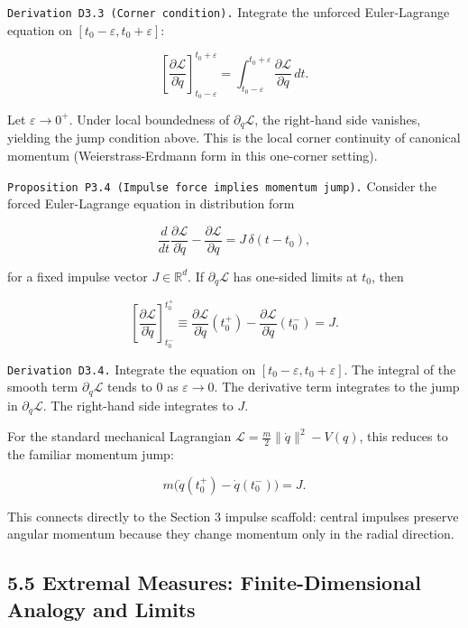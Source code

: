 \documentclass[
]{article}
\begin{document}
\texttt{Derivation\ D3.3\ (Corner\ condition).} Integrate the unforced
Euler-Lagrange equation on \([t_0-\varepsilon,t_0+\varepsilon]\):

\[
\left[\frac{\partial\mathcal L}{\partial\dot q}\right]_{t_0-\varepsilon}^{t_0+\varepsilon}
=\int_{t_0-\varepsilon}^{t_0+\varepsilon}\frac{\partial\mathcal L}{\partial q}\,dt.
\]

Let \(\varepsilon\to0^+\). Under local boundedness of
\(\partial_q\mathcal L\), the right-hand side vanishes, yielding the
jump condition above. This is the local corner continuity of canonical
momentum (Weierstrass-Erdmann form in this one-corner setting).

\texttt{Proposition\ P3.4\ (Impulse\ force\ implies\ momentum\ jump).}
Consider the forced Euler-Lagrange equation in distribution form

\[
\frac{d}{dt}\frac{\partial\mathcal L}{\partial\dot q}
-\frac{\partial\mathcal L}{\partial q}
=J\,\delta(t-t_0),
\]

for a fixed impulse vector \(J\in\mathbb R^d\). If
\(\partial_{\dot q}\mathcal L\) has one-sided limits at \(t_0\), then

\[
\left[\frac{\partial\mathcal L}{\partial\dot q}\right]_{t_0^-}^{t_0^+}
\equiv
\frac{\partial\mathcal L}{\partial\dot q}(t_0^+)-\frac{\partial\mathcal L}{\partial\dot q}(t_0^-)
=J.
\]

\texttt{Derivation\ D3.4.} Integrate the equation on
\([t_0-\varepsilon,t_0+\varepsilon]\). The integral of the smooth term
\(\partial_q\mathcal L\) tends to 0 as \(\varepsilon\to 0\). The
derivative term integrates to the jump in
\(\partial_{\dot q}\mathcal L\). The right-hand side integrates to
\(J\).

For the standard mechanical Lagrangian
\(\mathcal L=\frac{m}{2}\|\dot q\|^2-V(q)\), this reduces to the
familiar momentum jump:

\[
m\big(\dot q(t_0^+)-\dot q(t_0^-)\big)=J.
\]

This connects directly to the Section 3 impulse scaffold: central
impulses preserve angular momentum because they change momentum only in
the radial direction.

\hypertarget{extremal-measures-finite-dimensional-analogy-and-limits}{%
\subsection{5.5 Extremal Measures: Finite-Dimensional Analogy and
Limits}\label{extremal-measures-finite-dimensional-analogy-and-limits}}
\end{document}
